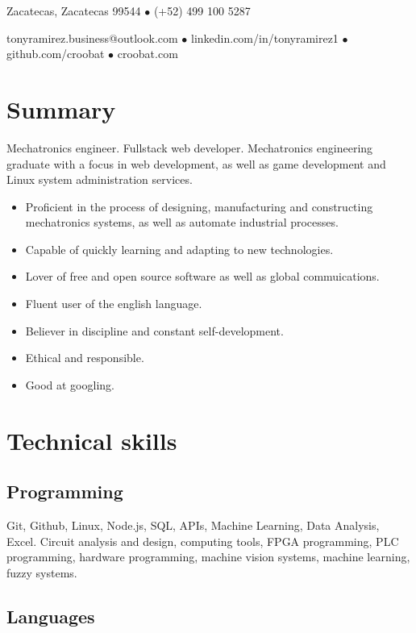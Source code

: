 \documentclass{article}
\author{Luis A. Ramírez García}
\makeatletter
\renewcommand{\maketitle}{
  \begin{center}
    {
      \huge\bfseries
      \theauthor{}
    }

    \vspace{1em}

    Zacatecas, Zacatecas 99544 $\bullet$ (+52) 499 100 5287

    \vspace{0.5em}

    tonyramirez.business@outlook.com $\bullet$ linkedin.com/in/tonyramirez1 $\bullet$ github.com/croobat $\bullet$ croobat.com

    \vspace{-0.5em}

  \end{center}
}
\makeatother
\begin{document}
  \maketitle

  \section{Summary}%

  Mechatronics engineer. Fullstack web developer. Mechatronics engineering graduate with a focus in web development, as well as game development and Linux system administration services.

  \begin{itemize}
    \item Proficient in the process of designing, manufacturing and constructing mechatronics systems, as well as automate industrial processes.

    \item Capable of quickly learning and adapting to new technologies.

    \item Lover of free and open source software as well as global commuications.

    \item Fluent user of the english language.

    \item Believer in discipline and constant self-development.

    \item Ethical and responsible.

    \item Good at googling.
  \end{itemize}%


  \section{Technical skills}%

  \subsection{Programming}

  Git, Github, Linux, Node.js, SQL, APIs, Machine Learning, Data Analysis, Excel. Circuit analysis and design, computing tools, FPGA programming, PLC programming,  hardware programming, machine vision systems, machine learning, fuzzy systems.

    \subsection{Languages}
\end{document}
